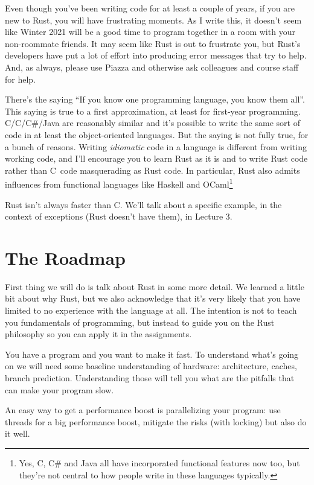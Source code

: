 \documentclass[a4paper]{report}
\newcommand{\CPP}{C\nolinebreak\hspace{-.05em}\raisebox{.4ex}{\tiny\bf +}\nolinebreak\hspace{-.10em}\raisebox{.4ex}{\tiny\bf +}}
\def\CPP{{C\nolinebreak[4]\hspace{-.05em}\raisebox{.4ex}{\tiny\bf ++}}}
\begin{document}
Even though you've been writing code for at least a couple of years, if you are new to Rust, you will have frustrating moments. As I write this, it doesn't seem like Winter 2021 will be a good time to program together in a room with your non-roommate friends. It may seem like Rust is out to frustrate you, but Rust's developers have put a lot of effort into producing error messages that try to help. And, as always, please use Piazza and otherwise ask colleagues and course staff for help.

There's the saying ``If you know one programming language, you know them all''. This saying is true to a first approximation, at least for first-year programming. C/\CPP/C\#/Java are reasonably similar and it's possible to write the same sort of code in at least the object-oriented languages. But the saying is not fully true, for a bunch of reasons. Writing \emph{idiomatic} code in a language is different from writing working code, and I'll encourage you to learn Rust as it is and to write Rust code rather than \CPP~code masquerading as Rust code. In particular, Rust also admits influences from functional languages like Haskell and OCaml\footnote{Yes, \CPP, C\# and Java all have incorporated functional features now too, but they're not central to how people write in these languages typically.}

Rust isn't always faster than \CPP. We'll talk about a specific example, in the context of exceptions (Rust doesn't have them), in Lecture 3.

\section*{The Roadmap}
First thing we will do is talk about Rust in some more detail. We learned a little bit about why Rust, but we also acknowledge that it's very likely that you have limited to no experience with the language at all. The intention is not to teach you fundamentals of programming, but instead to guide you on the Rust philosophy so you can apply it in the assignments. 

You have a program and you want to make it fast. To understand what's going on we will need some baseline understanding of hardware: architecture, caches, branch prediction. Understanding those will tell you what are the pitfalls that can make your program slow.

An easy way to get a performance boost is parallelizing your program: use threads for a big performance boost, mitigate the risks (with locking) but also do it well. 
\end{document}
